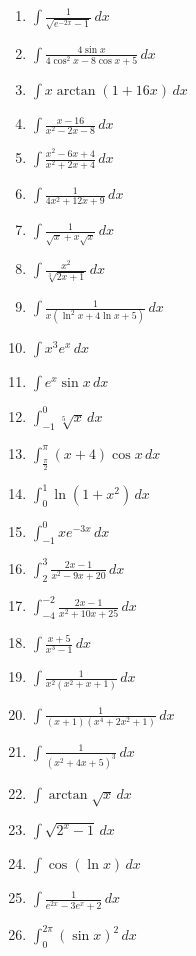 \documentclass[11pt,a4paper]{article}
\begin{document}
\begin{enumerate}
\item $\displaystyle \int \frac{1}{\sqrt{e^{-2x} - 1}} \, dx$
\item $\displaystyle \int \frac{4\sin x}{4\cos^{2} x - 8\cos x + 5} \, dx$
\item $\displaystyle \int x\arctan\left(1 + 16x\right) \, dx$
\item $\displaystyle \int \frac{x - 16}{x^{2} - 2x - 8} \, dx$
\item $\displaystyle \int \frac{x^{2} - 6x + 4}{x^{2} + 2x + 4} \, dx$
\item $\displaystyle \int \frac{1}{4x^{2} + 12x + 9} \, dx$
\item $\displaystyle \int \frac{1}{\sqrt{x} + x\sqrt{x}} \, dx$
\item $\displaystyle \int \frac{x^{2}}{\sqrt[3]{2x + 1}} \, dx$
\item $\displaystyle \int \frac{1}{x\left(\ln^{2} x + 4\ln x + 5\right)} \, dx$
\item $\displaystyle \int x^{3} e^{x} \, dx$
\item $\displaystyle \int e^{x}\sin x \, dx$
\item $\displaystyle \int_{-1}^{0} \sqrt[5]{x} \, dx$
\item $\displaystyle \int_{\frac{\pi}{2}}^{\pi} (x + 4)\cos x \, dx$
\item $\displaystyle \int_{0}^{1} \ln\left(1 + x^{2}\right) \, dx$
\item $\displaystyle \int_{-1}^{0} x e^{-3x} \, dx$
\item $\displaystyle \int_{2}^{3} \frac{2x - 1}{x^{2} - 9x + 20} \, dx$
\item $\displaystyle \int_{-4}^{-2} \frac{2x - 1}{x^{2} + 10x + 25} \, dx$
\item $\displaystyle \int \frac{x + 5}{x^{3} - 1} \, dx$
\item $\displaystyle \int \frac{1}{x^{2}\left(x^{2} + x + 1\right)} \, dx$
\item $\displaystyle \int \frac{1}{(x + 1)\left(x^{4} + 2x^{2} + 1\right)} \, dx$
\item $\displaystyle \int \frac{1}{\left(x^{2} + 4x + 5\right)^{3}} \, dx$
\item $\displaystyle \int \arctan\sqrt{x} \, dx$
\item $\displaystyle \int \sqrt{2^{x} - 1} \, dx$
\item $\displaystyle \int \cos(\ln x) \, dx$
\item $\displaystyle \int \frac{1}{e^{2x} - 3e^{x} + 2} \, dx$
\item $\displaystyle \int_{0}^{2\pi} (\sin x)^{2} \, dx$

\end{enumerate}
\end{document}
